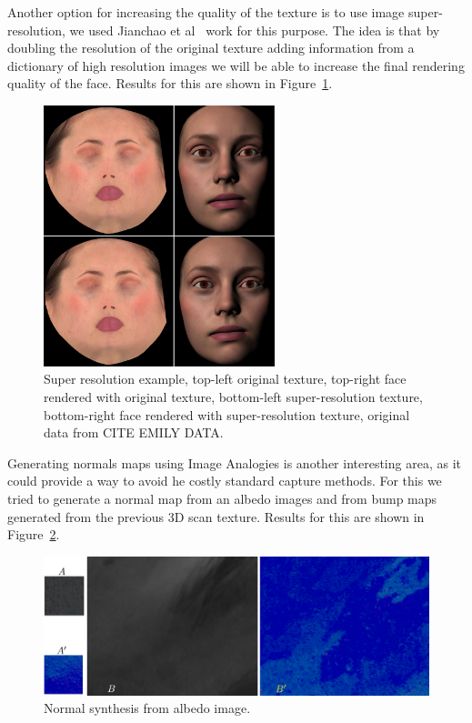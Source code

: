 \documentclass[11pt]{article}
\begin{document}
Another option for increasing the quality of the texture is to use image super-resolution, we used Jianchao et al~\cite{Jianchao2010} work for this purpose.
The idea is that by doubling the resolution of the original texture adding information from a dictionary of high resolution images we will be able to increase the final rendering quality of the face.
Results for this are shown in Figure~\ref{fig:emily_super_resolution}.

\begin{figure}[htbp!]
\centering
\includegraphics[width=0.6\textwidth]{img/emily_super_resolution}
	\caption{ Super resolution example, top-left original texture, top-right face rendered with original texture, bottom-left super-resolution texture, bottom-right face rendered with super-resolution texture, original data from CITE EMILY DATA.}
	\label{fig:emily_super_resolution}
\end{figure}

Generating normals maps using Image Analogies is another interesting area, as it could provide a way to avoid he costly standard capture methods.
For this we tried to generate a normal map from an albedo images and from bump maps generated from the previous 3D scan texture.
Results for this are shown in Figure~\ref{fig:normal_synthesis}.

\begin{figure}[htbp!]
\centering
\includegraphics[width=\textwidth]{img/normal_generation}
	\caption{ Normal synthesis from albedo image.}
	\label{fig:normal_synthesis}
\end{figure}
\end{document}
